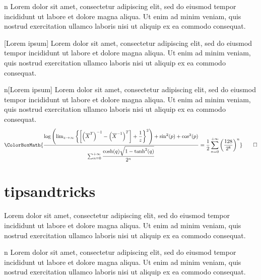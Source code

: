 \begin{notation}{n}
	Lorem dolor sit amet, consectetur adipiscing elit, sed do eiusmod tempor incididunt ut labore et dolore magna aliqua. Ut enim ad minim veniam, quis nostrud exercitation ullamco laboris nisi ut aliquip ex ea commodo consequat.
\end{notation}

\begin{notation}{}[Lorem ipsum]
	Lorem dolor sit amet, consectetur adipiscing elit, sed do eiusmod tempor incididunt ut labore et dolore magna aliqua. Ut enim ad minim veniam, quis nostrud exercitation ullamco laboris nisi ut aliquip ex ea commodo consequat.
\end{notation}

\begin{notation}{n}[Lorem ipsum]
	Lorem dolor sit amet, consectetur adipiscing elit, sed do eiusmod tempor incididunt ut labore et dolore magna aliqua. Ut enim ad minim veniam, quis nostrud exercitation ullamco laboris nisi ut aliquip ex ea commodo consequat.
	\begin{equation*}
		\ColorBoxMath{\dfrac{\log\left(\lim_{z\to\infty}\left\{\left[\left(\overline{X}^{T}\right)^{-1}-\left(\overline{X}^{-1}\right)^T\right]+\dfrac{1}{z}\right\}^2\right)+\sin^2(p)+\cos^2(p)}{\sum_{n=0}^{+\infty}\dfrac{\cosh(q)\sqrt{1-\tanh^2(q)}}{2^n}}=\dfrac{1}{2}\sum_{n=0}^{+\infty}\left(\dfrac{128}{2^8}\right)^n}\qedhere
	\end{equation*}
\end{notation}

\newpage

\section{tipsandtricks}

\begin{tipsandtricks}{}
	Lorem dolor sit amet, consectetur adipiscing elit, sed do eiusmod tempor incididunt ut labore et dolore magna aliqua. Ut enim ad minim veniam, quis nostrud exercitation ullamco laboris nisi ut aliquip ex ea commodo consequat.
\end{tipsandtricks}

\begin{tipsandtricks}{n}
	Lorem dolor sit amet, consectetur adipiscing elit, sed do eiusmod tempor incididunt ut labore et dolore magna aliqua. Ut enim ad minim veniam, quis nostrud exercitation ullamco laboris nisi ut aliquip ex ea commodo consequat.
\end{tipsandtricks}

